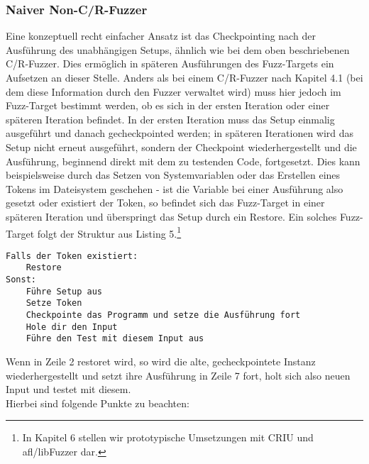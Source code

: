 \documentclass[a4paper]{article}
\begin{document}
\subsubsection{Naiver Non-C/R-Fuzzer}
Eine konzeptuell recht einfacher Ansatz ist das Checkpointing nach der Ausführung des unabhängigen Setups, ähnlich wie bei dem oben beschriebenen C/R-Fuzzer.
Dies ermöglich in späteren Ausführungen des Fuzz-Targets ein Aufsetzen an dieser Stelle.
Anders als bei einem C/R-Fuzzer nach Kapitel 4.1 (bei dem diese Information durch den Fuzzer verwaltet wird) muss hier jedoch im Fuzz-Target bestimmt werden, ob es sich in der ersten Iteration oder einer späteren Iteration befindet. 
In der ersten Iteration muss das Setup einmalig ausgeführt und danach gecheckpointed werden; in späteren Iterationen wird das Setup nicht erneut ausgeführt, sondern der Checkpoint wiederhergestellt und die Ausführung, beginnend direkt mit dem zu testenden Code, fortgesetzt.
Dies kann beispielsweise durch das Setzen von Systemvariablen oder das Erstellen eines Tokens im Dateisystem geschehen - ist die Variable bei einer Ausführung also gesetzt oder existiert der Token, so befindet sich das Fuzz-Target in einer späteren Iteration und überspringt das Setup durch ein Restore.
Ein solches Fuzz-Target folgt der Struktur aus Listing 5.\footnote{In Kapitel 6 stellen wir prototypische Umsetzungen mit CRIU und afl/libFuzzer dar.}
\begin{lstlisting}[caption=Struktur C/R-Fuzz-Target für Non-C/R-Fuzzer]
Falls der Token existiert:
    Restore
Sonst:
    Führe Setup aus
    Setze Token
    Checkpointe das Programm und setze die Ausführung fort
    Hole dir den Input
    Führe den Test mit diesem Input aus
\end{lstlisting}
Wenn in Zeile 2 restoret wird, so wird die alte, gecheckpointete Instanz wiederhergestellt und setzt ihre Ausführung in Zeile 7 fort, holt sich also neuen Input und testet mit diesem.\\
Hierbei sind folgende Punkte zu beachten:
\end{document}
